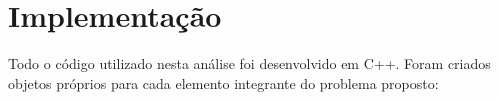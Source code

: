 \documentclass[final,3p]{elsarticle}
\numberwithin{equation}{section}
\begin{document}









\section{Implementação} \label{sec:implementacao}

        Todo o código utilizado nesta análise foi desenvolvido em C++. Foram criados objetos próprios para cada elemento integrante do problema proposto:
\end{document}

